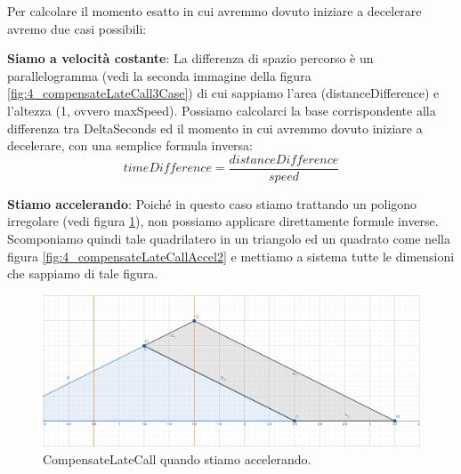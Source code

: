 \documentclass[main.tex]{subfiles}
\begin{document}
Per calcolare il momento esatto in cui avremmo dovuto iniziare a decelerare avremo due casi possibili: 
\begin{itemize}
    \item \textbf{Siamo a velocità costante}: La differenza di spazio percorso è un parallelogramma (vedi la seconda immagine della figura \ref{fig:4_compensateLateCall3Case}) di cui sappiamo l'area (distanceDifference) e l'altezza (1, ovvero maxSpeed). Possiamo calcolarci la base corrispondente alla differenza tra DeltaSeconds ed il momento in cui avremmo dovuto iniziare a decelerare, con una semplice formula inversa:
    \[timeDifference = \frac{distanceDifference}{speed}\]
    
    \begin{minipage}{.45\textwidth}
        \item \textbf{Stiamo accelerando}: Poiché in questo caso stiamo trattando un poligono irregolare (vedi figura \ref{fig:4_compensateLateCallAccel1}), non possiamo applicare direttamente formule inverse. Scomponiamo quindi tale quadrilatero in un triangolo ed un quadrato come nella figura \ref{fig:4_compensateLateCallAccel2} e mettiamo a sistema tutte le dimensioni che sappiamo di tale figura.
    \end{minipage}
    \hfill%
    \begin{minipage}{.475\textwidth}
        \begin{figure}[H]
            \centering
            \includegraphics[scale=0.2]{img/interpolazione/compensateLateCallAccel1.png}
            \captionsetup{justification=centering,margin=.3cm}
            \caption{CompensateLateCall quando stiamo accelerando.}
            \label{fig:4_compensateLateCallAccel1}
        \end{figure}
    \end{minipage}


\end{itemize}
\end{document}
